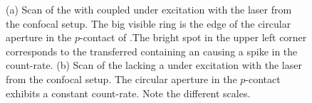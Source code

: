	\begin{figure}[!htb]
		\begin{subfigure}[t]{ 0.49\linewidth}
			\centering
			\caption{}
			\label{subfig::vcsel_confocal_laser_excitation_with_diamond}
		\end{subfigure}
		\hfill
		\begin{subfigure}[t]{ 0.49\linewidth}
			\centering
			\caption{}
			\label{subfig::confocal_laser_excitation_without_diamond}
		\end{subfigure}
		\caption[Scans of \VCSELs with and without \siv]{(a) Scan of the \BmFour with coupled \nd under excitation with the laser from the confocal setup. The big visible ring is the edge of the circular aperture in the $p$-contact of \BmFour.The bright spot in the upper left corner corresponds to the transferred \nd containing an \siv causing a spike in the count-rate. (b) Scan of the \BmTwo lacking a \nd under excitation with the laser from the confocal setup. The circular aperture in the $p$-contact exhibits a constant count-rate. Note the different scales.}
	\end{figure}

